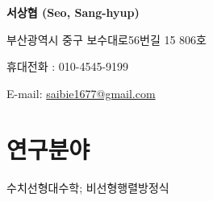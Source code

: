 \documentclass[11pt]{article} %
\begin{document}
{\LARGE\bfseries 서상협 (Seo, Sang-hyup)} %
\bigskip\bigskip\medskip %

부산광역시 중구 보수대로56번길 15 806호 %
\medskip %

휴대전화 : 010-4545-9199 %
\medskip %

E-mail: \href{mailto:saibie1677@gmail.com}{saibie1677@gmail.com}\\ %





%


\section*{연구분야}

수치선형대수학; 비선형행렬방정식 %


%
\end{document}
